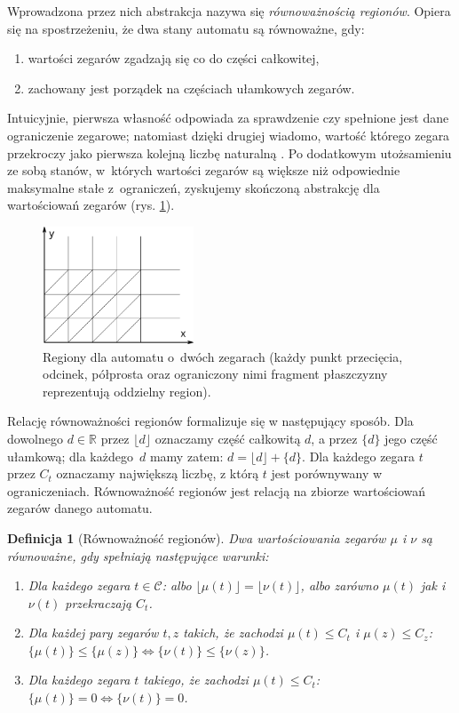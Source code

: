 \documentclass{pracamgr}
\newcommand{\floor}[1]{\lfloor #1 \rfloor}
\newcommand{\br}[1]{\{ #1 \}}
\theoremstyle{plain}
\newtheorem{definition}{Definicja}
\begin{document}
Wprowadzona przez nich abstrakcja nazywa się \emph{równoważnością
  regionów}. Opiera się na spostrzeżeniu, że dwa stany automatu są
równoważne, gdy:
\begin{samepage}
\begin{enumerate}
  \item wartości zegarów zgadzają się co do części całkowitej,
  \item zachowany jest porządek na częściach ułamkowych zegarów.
\end{enumerate}
\end{samepage}
Intuicyjnie, pierwsza własność odpowiada za sprawdzenie czy spełnione
jest dane ograniczenie zegarowe; natomiast dzięki drugiej wiadomo,
wartość którego zegara przekroczy jako pierwsza kolejną liczbę
naturalną \cite{am:decision}. Po dodatkowym utożsamieniu ze sobą
stanów, w~których wartości zegarów są większe niż odpowiednie
maksymalne stałe z~ograniczeń, zyskujemy skończoną abstrakcję dla
wartościowań zegarów (rys. \ref{img:regions}).
\begin{figure}
  \centering
  \includegraphics[width=0.4\textwidth]{img/ta-regions}
  \caption{Regiony dla automatu o~dwóch zegarach (każdy punkt
    przecięcia, odcinek, półprosta oraz ograniczony nimi fragment
    płaszczyzny reprezentują oddzielny region).}
  \label{img:regions}
\end{figure}

Relację równoważności regionów formalizuje się w następujący sposób.
Dla dowolnego $d\in\mathbb{R}$ przez $\floor{d}$ oznaczamy część
całkowitą $d$, a przez $\br{d}$ jego część ułamkową; dla każdego~$d$
mamy zatem: $d = \floor{d} + \br{d}$. Dla każdego zegara $t$ przez
$C_t$ oznaczamy największą liczbę, z którą $t$ jest porównywany w
ograniczeniach. Równoważność regionów jest relacją na zbiorze
wartościowań zegarów danego automatu.
\begin{definition}[Równoważność regionów]
  Dwa wartościowania zegarów $\mu$ i $\nu$ są równoważne, gdy
  spełniają następujące warunki:
  \begin{enumerate}
    \item Dla każdego zegara $t\in\mathcal{C}$: albo $\floor{\mu(t)} =
    \floor{\nu(t)}$, albo zarówno $\mu(t)$ jak i $\nu(t)$ przekraczają $C_t$.
    \item Dla każdej pary zegarów $t, z$ takich, że zachodzi $\mu(t)
    \leq C_t$ i $\mu(z) \leq C_z$:\\ \mbox{$\br{\mu(t)} \leq
      \br{\mu(z)} \iff \br{\nu(t)} \leq \br{\nu(z)}$}.
    \item Dla każdego zegara $t$ takiego, że zachodzi $\mu(t) \leq
    C_t$: $\br{\mu(t)}=0 \iff \br{\nu(t)}=0$.
  \end{enumerate}

\end{definition}
\end{document}
